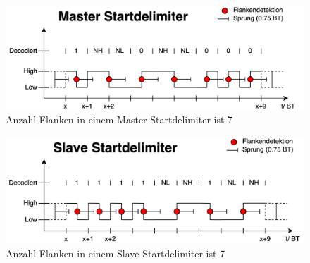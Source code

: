 \begin{figure}[H]
    \centering
    \includegraphics[width=\linewidth]{Figures/Chap3/Busauslastung/Master_Startdel.png}
    \caption{Anzahl Flanken in einem Master Startdelimiter ist 7}
    \label{fig:MasterStartdel}
\end{figure}

\begin{figure}[H]
    \centering
    \includegraphics[width=\linewidth]{Figures/Chap3/Busauslastung/Slave_Startdel.png}
    \caption{Anzahl Flanken in einem Slave Startdelimiter ist 7}
    \label{fig:SlaveStartdel}
\end{figure}

\newpage






\newpage

\label{app:Schema.pdf}







